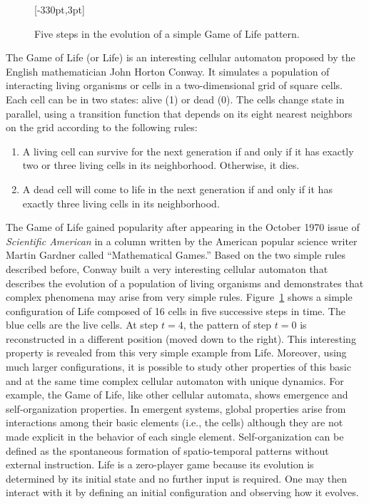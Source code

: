 \begin{figure}[!b]%
\hspace*{-7pt}[-330pt,3pt]
\caption{\label{fig:11.1}Five steps in the evolution of a simple Game of Life pattern.}
\end{figure}


The Game of Life (or Life) is an interesting cellular automaton proposed by the English mathematician John Horton Conway. It simulates a population of \hbox{interacting} living organisms or cells in a two-dimensional grid of square cells. Each cell can be in two states: alive (1) or dead (0). The cells change state in parallel, using a transition function that depends on its eight nearest neighbors on the grid according to the following rules:

\bgroup
\def\labelenumi{(\roman{enumi})}
\begin{enumerate}
\item A living cell can survive for the next generation if and only if it has exactly two or three living cells in its neighborhood. Otherwise, it dies.

\item A dead cell will come to life in the next generation if and only if it has exactly three living cells in its neighborhood.
\end{enumerate}
\egroup

The Game of Life gained popularity after appearing in the October 1970 issue of \textit{Scientific American} in a column written by the American popular science writer Martin Gardner called ``Mathematical Games.'' Based on the two simple rules described before, Conway built a very interesting cellular automaton that describes the evolution of a population of living organisms and demonstrates that complex phenomena may arise from very simple rules. Figure~\ref{fig:11.1} shows a simple configuration of Life composed of 16 cells in five successive steps in time. The blue cells are the live cells. At step $t= 4$, the pattern of step $t= 0$ is reconstructed in a different position (moved down to the right). This interesting property is revealed from this very simple example from Life. Moreover, using much larger configurations, it is possible to study other properties of this basic and at the same time complex cellular automaton with unique dynamics. For example, the Game of Life, like other cellular automata, shows emergence and self-organization properties. In emergent systems, global properties arise from interactions among their basic elements (i.e., the cells) although they are not made explicit in the behavior of each single element. Self-organization can be defined as the spontaneous formation of spatio-temporal patterns without external instruction. Life is a zero-player game because its evolution is determined by its initial state and no further input is required. One may then interact with it by defining an initial configuration and observing how it evolves.

